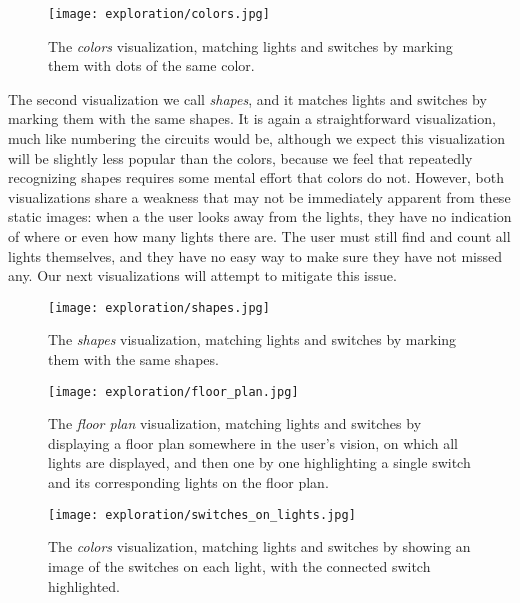     \begin{figure}
        \centering
        \texttt{[image: exploration/colors.jpg]}
        \caption{The \textit{colors} visualization, matching lights and switches by marking them with dots of the same color.}
        \label{fig:explor:colors_vis}
    \end{figure}
    
    The second visualization we call \textit{shapes}, and it matches lights and switches by marking them with the same shapes. It is again a straightforward visualization, much like numbering the circuits would be, although we expect this visualization will be slightly less popular than the colors, because we feel that repeatedly recognizing shapes requires some mental effort that colors do not. However, both visualizations share a weakness that may not be immediately apparent from these static images: when a the user looks away from the lights, they have no indication of where or even how many lights there are. The user must still find and count all lights themselves, and they have no easy way to make sure they have not missed any. Our next visualizations will attempt to mitigate this issue.
    
    \begin{figure}
        \centering
        \texttt{[image: exploration/shapes.jpg]}
        \caption{The \textit{shapes} visualization, matching lights and switches by marking them with the same shapes.}
        \label{fig:explor:shapes_vis}
    \end{figure}
    
    
    
    \begin{figure}
        \centering
        \texttt{[image: exploration/floor\_plan.jpg]}
        \caption{The \textit{floor plan} visualization, matching lights and switches by displaying a floor plan somewhere in the user's vision, on which all lights are displayed, and then one by one highlighting a single switch and its corresponding lights on the floor plan.}
        \label{fig:explor:floor_plan_vis}
    \end{figure}
    
    \begin{figure}
        \centering
        \texttt{[image: exploration/switches\_on\_lights.jpg]}
        \caption{The \textit{colors} visualization, matching lights and switches by showing an image of the switches on each light, with the connected switch highlighted.}
        \label{fig:explor:switches_on_lights_vis}
    \end{figure}
    

